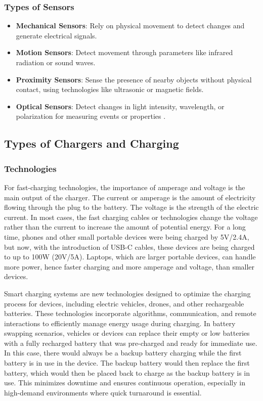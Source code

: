 \subsubsection{Types of Sensors}
\begin{itemize}
    \item \textbf{Mechanical Sensors}: Rely on physical movement to detect changes and generate electrical signals.
    \item \textbf{Motion Sensors}: Detect movement through parameters like infrared radiation or sound waves.
    \item \textbf{Proximity Sensors}: Sense the presence of nearby objects without physical contact, using technologies like ultrasonic or magnetic fields.
    \item \textbf{Optical Sensors}: Detect changes in light intensity, wavelength, or polarization for measuring events or properties \cite{dailysensors2021, huang2023, sensors2017}.
\end{itemize}

\subsection{Types of Chargers and Charging}
\subsubsection{Technologies}
For fast-charging technologies, the importance of amperage and voltage is the main output of the charger. The current or amperage is the amount of electricity flowing through the plug to the battery. The voltage is the strength of the electric current. In most cases, the fast charging cables or technologies change the voltage rather than the current to increase the amount of potential energy. For a long time, phones and other small portable devices were being charged by 5V/2.4A, but now, with the introduction of USB-C cables, these devices are being charged to up to 100W (20V/5A). Laptops, which are larger portable devices, can handle more power, hence faster charging and more amperage and voltage, than smaller devices. 
\cite{fastchargers}

Smart charging systems are new technologies designed to optimize the charging process for devices, including electric vehicles, drones, and other rechargeable batteries. These technologies incorporate algorithms, communication, and remote interactions to efficiently manage energy usage during charging. In battery swapping scenarios, vehicles or devices can replace their empty or low batteries with a fully recharged battery that was pre-charged and ready for immediate use. In this case, there would always be a backup battery charging while the first battery is in use in the device. The backup battery would then replace the first battery, which would then be placed back to charge as the backup battery is in use. This minimizes downtime and ensures continuous operation, especially in high-demand environments where quick turnaround is essential. 
\cite{vehiclessmartcharge}

